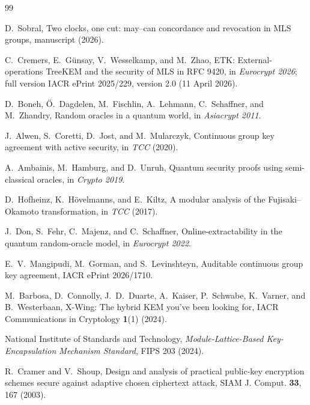 \documentclass[aps,prx,reprint,superscriptaddress,nofootinbib,floatfix]{revtex4-2}
\theoremstyle{remark}
\begin{document}
\begin{thebibliography}{99}

 D.~Sobral, Two clocks, one cut: may--can concordance and revocation in MLS groups, manuscript (2026).

 C.~Cremers, E.~G\"unsay, V.~Wesselkamp, and M.~Zhao, ETK: External-operations TreeKEM and the security of MLS in RFC 9420, in \emph{Eurocrypt 2026}; full version IACR ePrint 2025/229, version 2.0 (11 April 2026).

 D.~Boneh, \"O.~Dagdelen, M.~Fischlin, A.~Lehmann, C.~Schaffner, and M.~Zhandry, Random oracles in a quantum world, in \emph{Asiacrypt 2011}.

 J.~Alwen, S.~Coretti, D.~Jost, and M.~Mularczyk, Continuous group key agreement with active security, in \emph{TCC} (2020).

 A.~Ambainis, M.~Hamburg, and D.~Unruh, Quantum security proofs using semi-classical oracles, in \emph{Crypto 2019}.

 D.~Hofheinz, K.~H\"ovelmanns, and E.~Kiltz, A modular analysis of the Fujisaki--Okamoto transformation, in \emph{TCC} (2017).

 J.~Don, S.~Fehr, C.~Majenz, and C.~Schaffner, Online-extractability in the quantum random-oracle model, in \emph{Eurocrypt 2022}.

 E.~V.~Mangipudi, M.~Gorman, and S.~Levinshteyn, Auditable continuous group key agreement, IACR ePrint 2026/1710.

 M.~Barbosa, D.~Connolly, J.~D.~Duarte, A.~Kaiser, P.~Schwabe, K.~Varner, and B.~Westerbaan, X-Wing: The hybrid KEM you've been looking for, IACR Communications in Cryptology \textbf{1}(1) (2024).

 National Institute of Standards and Technology, \emph{Module-Lattice-Based Key-Encapsulation Mechanism Standard}, FIPS 203 (2024).

 R.~Cramer and V.~Shoup, Design and analysis of practical public-key encryption schemes secure against adaptive chosen ciphertext attack, SIAM J. Comput. \textbf{33}, 167 (2003).

\end{thebibliography}
\end{document}
